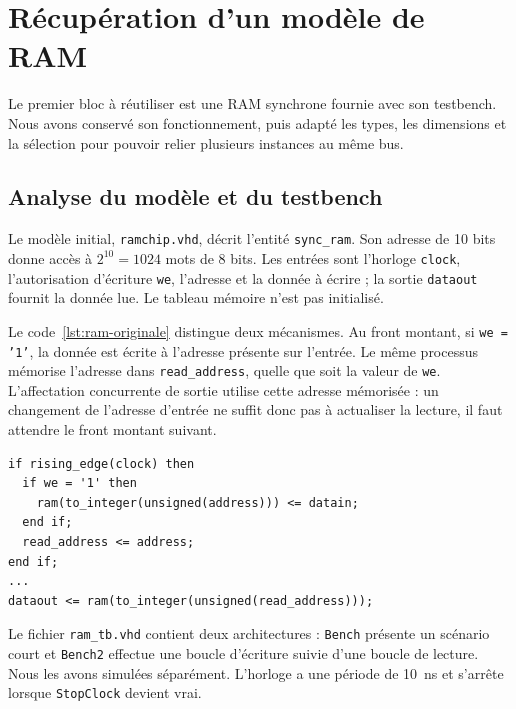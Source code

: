 \section{Récupération d'un modèle de RAM}
\label{sec:ram}

Le premier bloc à réutiliser est une RAM synchrone fournie avec son testbench.
Nous avons conservé son fonctionnement, puis adapté les types, les dimensions et la
sélection pour pouvoir relier plusieurs instances au même bus.

\subsection{Analyse du modèle et du testbench}

Le modèle initial, \texttt{ramchip.vhd}, décrit l'entité \texttt{sync\_ram}.
Son adresse de 10 bits donne accès à $2^{10}=1024$ mots de 8 bits. Les entrées sont
l'horloge \texttt{clock}, l'autorisation d'écriture \texttt{we}, l'adresse et la donnée à
écrire ; la sortie \texttt{dataout} fournit la donnée lue. Le tableau mémoire n'est pas
initialisé.

Le code~\ref{lst:ram-originale} distingue deux mécanismes. Au front montant, si
\texttt{we = '1'}, la donnée est écrite à l'adresse présente sur l'entrée. Le même
processus mémorise l'adresse dans \texttt{read\_address}, quelle que soit la valeur de
\texttt{we}. L'affectation concurrente de sortie utilise cette adresse mémorisée : un
changement de l'adresse d'entrée ne suffit donc pas à actualiser la lecture, il faut
attendre le front montant suivant.

\noindent\begin{minipage}{\linewidth}
\begin{lstlisting}[style=vhdl, caption={Lecture et écriture du modèle initial}, label={lst:ram-originale}]
if rising_edge(clock) then
  if we = '1' then
    ram(to_integer(unsigned(address))) <= datain;
  end if;
  read_address <= address;
end if;
...
dataout <= ram(to_integer(unsigned(read_address)));
\end{lstlisting}
\end{minipage}\par

Le fichier \texttt{ram\_tb.vhd} contient deux architectures : \texttt{Bench} présente
un scénario court et \texttt{Bench2} effectue une boucle d'écriture suivie d'une boucle de
lecture. Nous les avons simulées séparément. L'horloge a une période de 10~ns et s'arrête
lorsque \texttt{StopClock} devient vrai.

